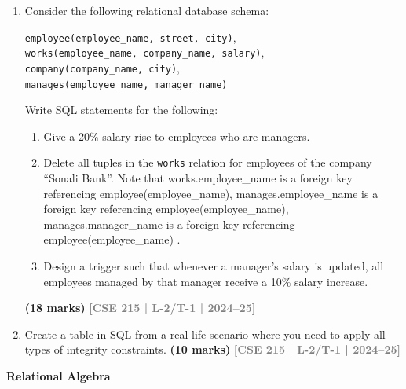 \documentclass[12pt,a3paper]{article}
\newcommand{\yr}[1]{\hfill\textcolor{gray}{\small\textbf{[#1]}}}
\newcommand{\mk}[1]{\textcolor{orange!70!black}{\small\textbf{(#1 marks)}}}
\newcommand{\subtopic}[2]{%
  \vspace{10pt}
  \noindent\begin{tcolorbox}[colback=#1!8,colframe=#1,boxrule=0.6pt,arc=4pt,
    left=6pt,right=6pt,top=4pt,bottom=4pt]
    \small\bfseries\textcolor{#1}{#2}
  \end{tcolorbox}
  \vspace{2pt}
}
\begin{document}
\begin{enumerate}
\item Consider the following relational database schema:
\begin{center}
\texttt{employee(employee\_name, street, city)},\quad \\\texttt{works(employee\_name, company\_name, salary)},\\
\texttt{company(company\_name, city)},\quad \\\texttt{manages(employee\_name, manager\_name)}
\end{center}
Write SQL statements for the following:
\begin{enumerate}
  \item Give a 20\% salary rise to employees who are managers.
  \item Delete all tuples in the \texttt{works} relation for employees of the company ``Sonali Bank''. 
  Note that works.employee_name is a foreign key referencing employee(employee_name),
 manages.employee_name is a foreign key referencing employee(employee_name),
 manages.manager_name is a foreign key referencing employee(employee_name) .
  \item Design a trigger such that whenever a manager's salary is updated, all employees managed by that manager receive a 10\% salary increase.
\end{enumerate}
\mk{18} \yr{CSE 215 | L-2/T-1 | 2024--25}

\item Create a table in SQL from a real-life scenario where you need to apply all types of integrity constraints.
\mk{10} \yr{CSE 215 | L-2/T-1 | 2024--25}

\end{enumerate}

\subtopic{cB}{Relational Algebra}
\label{sub:s3-relalg}
\end{document}
